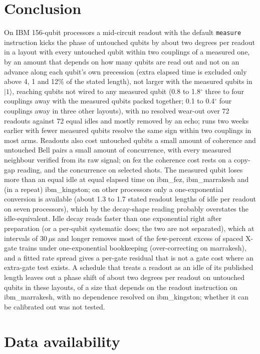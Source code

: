\documentclass[reprint,amsmath,amssymb,aps,superscriptaddress,nofootinbib]{revtex4-2}
\newcommand{\us}{\,$\mu$s}
\begin{document}
\section{Conclusion}

On IBM 156-qubit processors a mid-circuit readout with the default \texttt{measure} instruction kicks the phase of untouched qubits by about two degrees per readout in a layout with every untouched qubit within two couplings of a measured one, by an amount that depends on how many qubits are read out and not on an advance along each qubit's own precession (extra elapsed time is excluded only above 4, 1 and 12\% of the stated length), not larger with the measured qubits in $|1\rangle$, reaching qubits not wired to any measured qubit (0.8 to 1.8$^\circ$ three to four couplings away with the measured qubits packed together; 0.1 to 0.4$^\circ$ four couplings away in three other layouts), with no resolved wear-out over 72 readouts against 72 equal idles and mostly removed by an echo; runs two weeks earlier with fewer measured qubits resolve the same sign within two couplings in most arms. Readouts also cost untouched qubits a small amount of coherence and untouched Bell pairs a small amount of concurrence, with every measured neighbour verified from its raw signal; on fez the coherence cost rests on a copy-gap reading, and the concurrence on selected shots. The measured qubit loses more than an equal idle at equal elapsed time on ibm\_fez, ibm\_marrakesh and (in a repeat) ibm\_kingston; on other processors only a one-exponential conversion is available (about 1.3 to 1.7 stated readout lengths of idle per readout on seven processors), which by the decay-shape reading probably overstates the idle-equivalent. Idle decay reads faster than one exponential right after preparation (or a per-qubit systematic does; the two are not separated), which at intervals of 30\us{} and longer removes most of the few-percent excess of spaced X-gate trains under one-exponential bookkeeping (over-correcting on marrakesh), and a fitted rate spread gives a per-gate residual that is not a gate cost where an extra-gate test exists. A schedule that treats a readout as an idle of its published length leaves out a phase shift of about two degrees per readout on untouched qubits in these layouts, of a size that depends on the readout instruction on ibm\_marrakesh, with no dependence resolved on ibm\_kingston; whether it can be calibrated out was not tested.

\section{Data availability}
\end{document}
